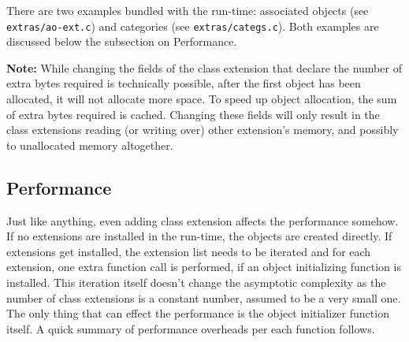 There are two examples bundled with the run-time: associated objects (see \verb=extras/ao-ext.c=) and categories (see \texttt{extras/categs.c}). Both examples are discussed below the subsection on Performance.

\textbf{Note:} While changing the fields of the class extension that declare the number of extra bytes required is technically possible, after the first object has been allocated, it will not allocate more space. To speed up object allocation, the sum of extra bytes required is cached. Changing these fields will only result in the class extensions reading (or writing over) other extension's memory, and possibly to unallocated memory altogether.

\subsection{Performance}
Just like anything, even adding class extension affects the performance somehow. If no extensions are installed in the run-time, the objects are created directly. If extensions get installed, the extension list needs to be iterated and for each extension, one extra function call is performed, if an object initializing function is installed. This iteration itself doesn't change the asymptotic complexity as the number of class extensions is a constant number, assumed to be a very small one. The only thing that can effect the performance is the object initializer function itself. A quick summary of performance overheads per each function follows.

